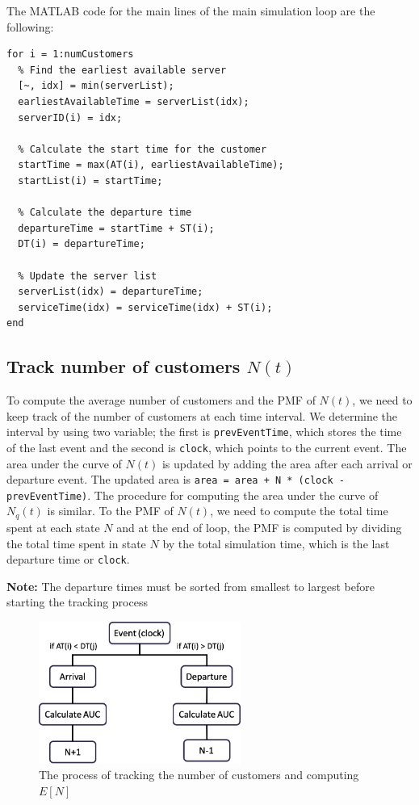 \documentclass[12pt, a4paper]{article}
\begin{document}
The MATLAB code for the main lines of the main simulation loop
are the following:
\begin{lstlisting}[style=Matlab-editor, basicstyle=\ttfamily\footnotesize]
%------simulation main loop-------
for i = 1:numCustomers
  % Find the earliest available server
  [~, idx] = min(serverList);
  earliestAvailableTime = serverList(idx);
  serverID(i) = idx;
  
  % Calculate the start time for the customer
  startTime = max(AT(i), earliestAvailableTime);
  startList(i) = startTime;
  
  % Calculate the departure time
  departureTime = startTime + ST(i);
  DT(i) = departureTime;
  
  % Update the server list
  serverList(idx) = departureTime;
  serviceTime(idx) = serviceTime(idx) + ST(i); 
end
\end{lstlisting}

\subsection{Track number of customers $N(t)$}
To compute the average number of customers and the PMF of $N(t)$,
we need to keep track of the number of customers at each time interval.
We determine the interval by using two variable; the first is 
\texttt{prevEventTime}, which stores the time of the last event and
the second is \texttt{clock}, which points to the current event.
The area under the curve of $N(t)$ is updated by adding the area 
after each arrival or departure event. The updated area is
\texttt{area = area + N * (clock - prevEventTime)}. The procedure for
computing the area under the curve of $N_q(t)$ is similar. To the PMF 
of $N(t)$, we need to compute the total time spent at each state $N$ and at the end of loop, 
the PMF is computed by dividing the total time spent in state $N$ by the total 
simulation time, which is the last departure time or \texttt{clock}. 

{\color{red} \textbf{Note:} The departure times must be sorted from smallest to largest
before starting the tracking process}

\begin{figure}[H]
  \vspace{2em}
  \centering 
  \includegraphics[width=250px]{images/track_N.png}
  \caption{The process of tracking the number of customers and computing $E[N]$}
\end{figure}
\end{document}
